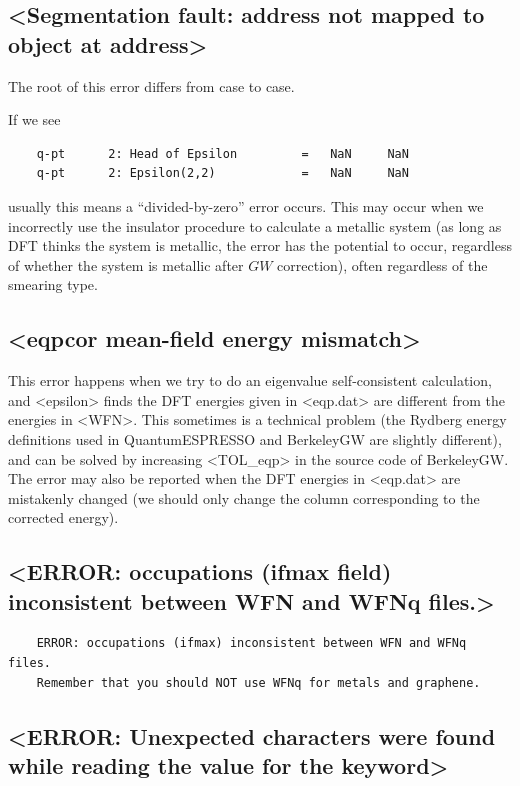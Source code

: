 \documentclass[hyperref, a4paper, 12pt]{report}
\def\texttt#1{<#1>}%
\newcommand{\shortcode}[1]{\texttt{#1}}
\begin{document}
\subsection{\shortcode{Segmentation fault: address not mapped to object at address}}\label{sec:segment-fault-1}

The root of this error differs from case to case.

If we see 
\begin{lstlisting}
    q-pt      2: Head of Epsilon         =   NaN     NaN    
    q-pt      2: Epsilon(2,2)            =   NaN     NaN    
\end{lstlisting}
usually this means a ``divided-by-zero'' error occurs.
This may occur when we incorrectly use the insulator procedure to calculate a metallic system 
(as long as DFT thinks the system is metallic, the error has the potential to occur,
regardless of whether the system is metallic after $GW$ correction),
often regardless of the smearing type. 

\subsection{\shortcode{eqpcor mean-field energy mismatch}}

This error happens when we try to do an eigenvalue self-consistent calculation,
and \shortcode{epsilon} finds the DFT energies given in \shortcode{eqp.dat} 
are different from the energies in \shortcode{WFN}.
This sometimes is a technical problem 
(the Rydberg energy definitions used in QuantumESPRESSO and BerkeleyGW are slightly different),
and can be solved by increasing \shortcode{TOL_eqp} in the source code of BerkeleyGW.
The error may also be reported 
when the DFT energies in \shortcode{eqp.dat} are mistakenly changed
(we should only change the column corresponding to the corrected energy).


\subsection{\shortcode{ERROR: occupations (ifmax field) inconsistent between WFN and WFNq files.}}

\begin{lstlisting}
    ERROR: occupations (ifmax) inconsistent between WFN and WFNq files.
    Remember that you should NOT use WFNq for metals and graphene.  
\end{lstlisting}

\subsection{\shortcode{ERROR: Unexpected characters were found while reading the value for the keyword}}
\end{document}
